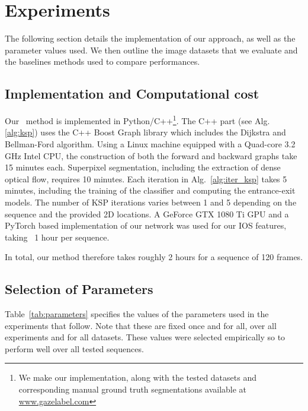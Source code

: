 \section{Experiments}
\label{sec:experiments}
The following section details the implementation of our approach, as well as the parameter values used. We then outline the image datasets that we evaluate and the baselines methods used to compare performances.

\subsection{Implementation and Computational cost}
Our \KSP ~method is implemented in Python/C++\footnote{We make our implementation, along with the tested datasets and corresponding manual ground truth segmentations available at \label{fn:website}\href{www.gazelabel.com}{www.gazelabel.com}}.
The C++ part (see Alg. \ref{alg:ksp}) uses the C++ Boost Graph library \cite{sick02} which includes the Dijkstra and Bellman-Ford algorithm.
Using a Linux machine equipped with a Quad-core 3.2 GHz Intel CPU, the construction of both the forward and backward graphs take 15 minutes each.
Superpixel segmentation, including the extraction of dense optical flow, requires 10 minutes.
Each iteration in Alg.~\ref{alg:iter_ksp} takes 5 minutes, including the training of the classifier and computing the entrance-exit models.
The number of KSP iterations varies between 1 and 5 depending on the sequence and the provided 2D locations.
A GeForce GTX 1080 Ti GPU and a PyTorch \cite{pytorch} based implementation of our network was used for our IOS features, taking ~1 hour per sequence.

In total, our method therefore takes roughly 2 hours for a sequence of 120 frames.

\subsection{Selection of Parameters}
Table~\ref{tab:parameters} specifies the values of the parameters used in the experiments that follow.
Note that these are fixed once and for all, over all experiments and for all datasets. These values were selected empirically so to perform well over all tested sequences.

